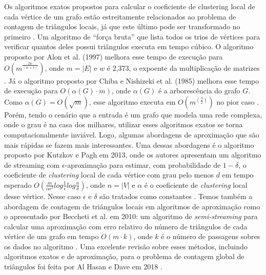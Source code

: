 Os algoritmos exatos propostos para calcular o coeficiente de clustering local de cada vértice
de um grafo estão estreitamente relacionados ao problema de contagem de triângulos locais,
já que este último pode ser transformado no primeiro \cite[64]{Lima2022}. Um algoritmo de “força bruta” que lista todos os trios de vértices para verificar quantos deles possui triângulos executa em tempo cúbico. O algoritmo proposto por Alon et al. (1997) %
melhora esse tempo de execução para $O(m^{\frac{2w}{(w+1)}})$, onde $m = |E|$ e $w$ é 2,373, o expoente da multiplicação de matrizes \cite[209--223]{Alon1997}. Já o algoritmo proposto por Chiba e Nishizeki et al. (1985) %
melhora esse tempo de execução para $O(\alpha(G) \cdot m)$, onde $\alpha(G)$ é a arborescência do grafo $G$. Como $\alpha(G) = O(\sqrt{m})$, esse algoritmo executa em $O(m^(\frac{3}{2}))$ no pior caso \cite[210--223]{Chiba1985}.
Porém, tendo o cenário que a entrada é um grafo que modela uma rede complexa, onde o grau
é na casa dos milhares, utilizar esses algoritmos exatos se torna computacionalmente inviável.
Logo, algumas abordagens de aproximação que são mais rápidas se fazem mais interessantes.
Uma dessas abordagens é o algoritmo proposto por Kutzkov e Pagh em 2013, onde os autores apresentam um algoritmo de streaming com $\epsilon$-aproximação para estimar, com probabilidade de $1-\delta$, o coeficiente de \textit{clustering} local de cada vértice com grau pelo menos $d$ em tempo esperado $O(\frac{m}{\alpha\epsilon^2}log\frac{1}{\epsilon}log\frac{n}{\delta})$, onde $n = |V|$ e $\alpha$ é o coeficiente de \textit{clustering} local desse vértice. Nesse caso $\epsilon$ e $\delta$ são tratados como constantes \cite[677--686]{Kutzkov2013}. Temos também a abordagem de contagem
de triângulos locais em algoritmos de aproximação como o apresentado por Beccheti et al. em
2010: um algoritmo de \textit{semi-streaming} para calcular uma aproximação com erro relativo do número de triângulos de cada vértice de um grafo em tempo $O(m \cdot k)$, onde $k$ é o número de
passagens sobres os dados no algoritmo \cite[1--28]{Becchetti2010}. Uma excelente revisão sobre esses métodos, incluindo algoritmos exatos e de aproximação, para o problema de contagem global de triângulos foi feita por Al Hasan e Dave em 2018 \cite{AlHasan2018}.

